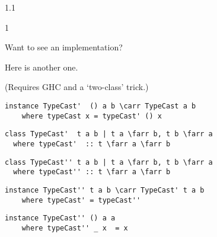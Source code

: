 \documentclass{slides}
\newenvironment{myslide}{\begin{slide}\color{Blue}\begin{boxedminipage}{1.1\hsize}\begin{boxedminipage}{1\hsize}\color{Black}
\vspace{-170\in}
}{%
\smallskip
\end{boxedminipage}
\end{boxedminipage}
\end{slide}}
\newenvironment{myslide}{\begin{slide}
}{%
\end{slide}}
\newenvironment{myslide}{\begin{slide}\color{White}\begin{boxedminipage}{1.1\hsize}\color{Black}
\vspace{-170\in}
}{%
\smallskip
\end{boxedminipage}
\end{slide}}
\newcommand{\header}[1]{{\large \color{Red} #1}}
\newcommand{\blau}[1]{{\vspace{-50\in}\normalsize \color{Blue} #1}}
\newcommand{\farr}{\ensuremath{\to}}
\newcommand{\carr}{\ensuremath{\Rightarrow}}
\begin{document}
\begin{myslide}

\header{Want to see an implementation?}

\vspace{-77\in}

\blau{Here is another one.}

\vspace{-77\in}

{\tiny (Requires GHC and a `two-class' trick.)}

\bigskip

\begin{Verbatim}[fontfamily=courier,fontsize=\tiny,commandchars=\\\{\}]
 instance TypeCast'  () a b \carr TypeCast a b
    where typeCast x = typeCast' () x
\end{Verbatim}
\smallskip
\begin{Verbatim}[fontfamily=courier,fontsize=\tiny,commandchars=\\\{\}]
 class TypeCast'  t a b | t a \farr b, t b \farr a
  where typeCast'  :: t \farr a \farr b
\end{Verbatim}
\smallskip
\begin{Verbatim}[fontfamily=courier,fontsize=\tiny,commandchars=\\\{\}]
 class TypeCast'' t a b | t a \farr b, t b \farr a
  where typeCast'' :: t \farr a \farr b
\end{Verbatim}
\smallskip
\begin{Verbatim}[fontfamily=courier,fontsize=\tiny,commandchars=\\\{\}]
 instance TypeCast'' t a b \carr TypeCast' t a b
    where typeCast' = typeCast''
\end{Verbatim}
\smallskip
\begin{Verbatim}[fontfamily=courier,fontsize=\tiny,commandchars=\\\{\}]
 instance TypeCast'' () a a
    where typeCast'' _ x  = x
\end{Verbatim}

\end{myslide}



\end{document}
